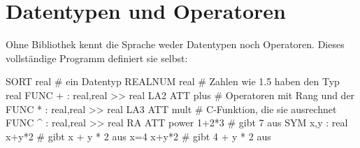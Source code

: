 \documentclass[a4paper,11pt]{article}
\begin{document}
\section{Datentypen und Operatoren}\label{sec:sorten}
Ohne Bibliothek kennt die Sprache weder Datentypen noch Operatoren. Dieses
vollständige Programm definiert sie selbst:
\begin{beispiel}
SORT real                                   # ein Datentyp
REALNUM real                                # Zahlen wie 1.5 haben den Typ real
FUNC + : real,real >> real LA2 ATT plus     # Operatoren mit Rang und der
FUNC * : real,real >> real LA3 ATT mult     # C-Funktion, die sie ausrechnet
FUNC ^ : real,real >> real RA  ATT power
1+2*3                                       # gibt 7 aus
SYM x,y : real
x+y*2                                       # gibt x + y * 2 aus
x=4
x+y*2                                       # gibt 4 + y * 2 aus
\end{beispiel}
\end{document}
